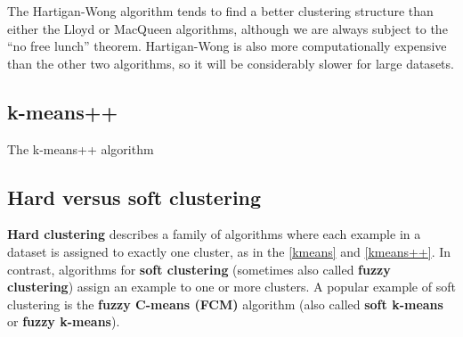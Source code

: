 The Hartigan-Wong algorithm tends to find a better clustering structure than either the Lloyd or MacQueen algorithms, although we are always subject to the “no free lunch” theorem. Hartigan-Wong is also more computationally expensive than the other two algorithms, so it will be considerably slower for large datasets.


\subsection{k-means++}
\begin{algorithm}
    \caption{The k-means++ algorithm\label{kmeans++}}
\end{algorithm}
\subsection{Hard versus soft clustering}
\textbf{Hard clustering} describes a family of algorithms where each example in a dataset is assigned to exactly one cluster, as in the \autoref{kmeans} and \autoref{kmeans++}. In contrast, algorithms for \textbf{soft clustering} (sometimes also called \textbf{fuzzy clustering}) assign an example to one or more clusters. A popular example of soft clustering is the \textbf{fuzzy C-means (FCM)} algorithm (also called \textbf{soft k-means} or \textbf{fuzzy k-means}).

